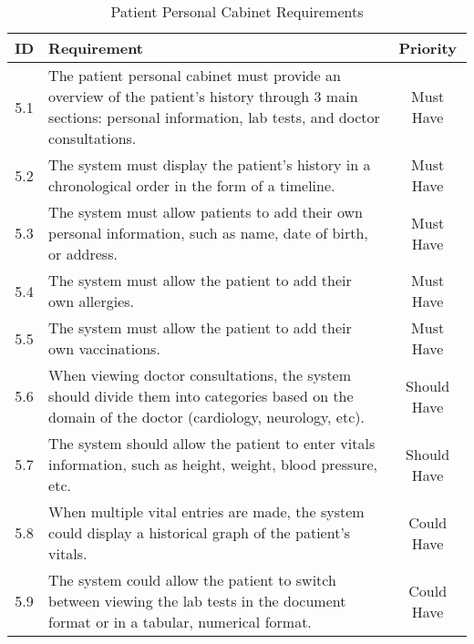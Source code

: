 \begin{table}[h!]
    \centering
    \begin{tabular}{|c|p{10cm}|c|}
    \hline
    \textbf{ID}  & \textbf{Requirement}  & \textbf{Priority} \\ \hline
    5.1  & The patient personal cabinet must provide an overview of the patient's history through 3 main sections: personal information, lab tests, and doctor consultations. & Must Have \\ \hline
    5.2  & The system must display the patient's history in a chronological order in the form of a timeline. & Must Have \\ \hline
    5.3  & The system must allow patients to add their own personal information, such as name, date of birth, or address. & Must Have \\ \hline
    5.4  & The system must allow the patient to add their own allergies. & Must Have \\ \hline
    5.5  & The system must allow the patient to add their own vaccinations. & Must Have \\ \hline
    5.6  & When viewing doctor consultations, the system should divide them into categories based on the domain of the doctor (cardiology, neurology, etc). & Should Have \\ \hline
    5.7  & The system should allow the patient to enter vitals information, such as height, weight, blood pressure, etc. & Should Have \\ \hline
    5.8  & When multiple vital entries are made, the system could display a historical graph of the patient's vitals. & Could Have \\ \hline
    5.9 & The system could allow the patient to switch between viewing the lab tests in the document format or in a tabular, numerical format. & Could Have \\ \hline
    \end{tabular}
    \caption{Patient Personal Cabinet Requirements}
\end{table}

